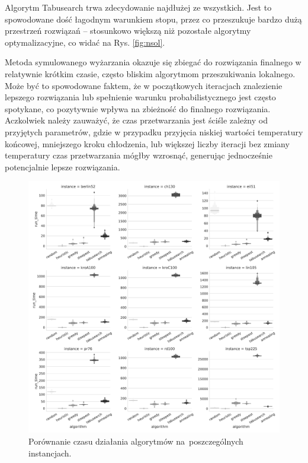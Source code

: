 {\color{part2}
Algorytm Tabusearch trwa zdecydowanie najdłużej ze wszystkich. Jest to spowodowane dość łagodnym warunkiem stopu, przez co przeszukuje bardzo dużą przestrzeń rozwiązań -- stosunkowo większą niż pozostałe algorytmy optymalizacyjne, co widać na Rys. \ref{fig:nsol}.

Metoda symulowanego wyżarzania okazuje się zbiegać do rozwiązania finalnego w relatywnie krótkim czasie, często bliskim algorytmom przeszukiwania lokalnego. Może być to spowodowane faktem, że w początkowych iteracjach znalezienie lepszego rozwiązania lub spełnienie warunku probabilistycznego jest często spotykane, co pozytywnie wpływa na zbieżność do finalnego rozwiązania. Aczkolwiek należy zauważyć, że czas przetwarzania jest ściśle zależny od przyjętych parametrów, gdzie w przypadku przyjęcia niskiej wartości temperatury końcowej, mniejszego kroku chłodzenia, lub większej liczby iteracji bez zmiany temperatury czas przetwarzania mógłby wzrosnąć, generując jednocześnie potencjalnie lepsze rozwiązania.
}

\begin{figure}[H]
\begin{center}
\includegraphics[width=1.0\textwidth]{graphs/time_comparison_letval.pdf}
\end{center}
\caption{Porównanie czasu działania algorytmów na~poszczególnych instancjach.}
\label{fig:time}
\end{figure}

